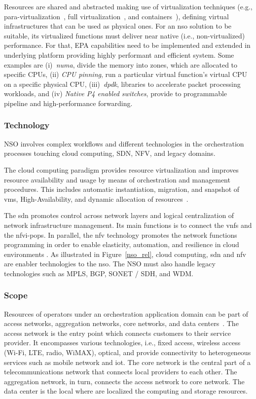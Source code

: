 Resources are shared and abstracted making use of virtualization techniques (e.g., para-virtualization~\cite{4299349}, full virtualization~\cite{4482796}, and containers~\cite{6906035}), defining virtual infrastructures that can be used as physical ones.
For an \gls{nso} solution to be suitable, its virtualized functions must deliver near native (i.e., non-virtualized) performance. For that, EPA capabilities need to be implemented and extended in underlying platform providing highly performant and efficient system. Some examples are (i)\textit{~\gls{numa}}, divide the memory into zones, which are allocated to specific CPUs, (ii) \textit{CPU pinning}, run a particular virtual function’s virtual CPU on a specific physical CPU, (iii)~\textit{\gls{dpdk}}, libraries to accelerate packet processing workloads, and (iv) \textit{Native P4 enabled switches}, provide to programmable pipeline and high-performance forwarding. 

\subsubsection{Technology}
NSO involves complex workflows and different technologies in the orchestration processes touching cloud computing, SDN, NFV, and legacy domains.      

The cloud computing paradigm provides resource virtualization and improves resource availability and usage by means of orchestration and management procedures. This includes automatic instantiation, migration, and snapshot of \glspl{vm}, High-Availability, and dynamic allocation of resources~\cite{ETSI2012NetworkAction}. 

The \gls{sdn} promotes control across network layers and logical centralization of network infrastructure management. Its main functions is to connect the \glspl{vnf} and the \gls{nfvi}-\glspl{pop}. In parallel, the \gls{nfv} technology promotes the network functions programming in order to enable elasticity, automation, and resilience in cloud environments \cite{Rotsos2017NetworkSurvey}. As illustrated in Figure~\ref{nso_rel}, cloud computing, \gls{sdn} and \gls{nfv} are enabler technologies to the \gls{nso}. The NSO must also handle legacy technologies such as MPLS, BGP, SONET / SDH, and WDM. 

\subsubsection{Scope}

Resources of operators under an orchestration application domain can be part of access networks, aggregation networks, core networks, and data centers~\cite{5GPPPArchitectureWorkingGroup2016ViewArchitecture}. The access network is the entry point which connects customers to their service provider. It encompasses various technologies, i.e., fixed access, wireless access (Wi-Fi, LTE, radio, WiMAX), optical, and provide connectivity to heterogeneous services such as mobile network and \gls{iot}. The core network is the central part of a telecommunications network that connects local providers to each other. The aggregation network, in turn, connects the access network to core network. The data center is the local where are localized the computing and storage resources.

